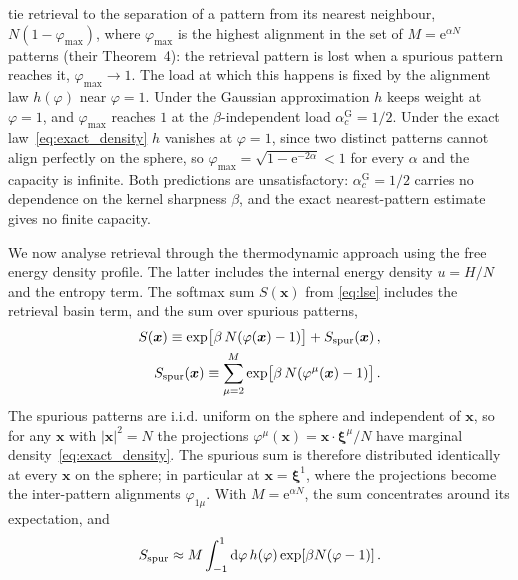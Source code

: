 \documentclass[letterpaper]{article} %
\newcommand{\bxi}{\boldsymbol{\xi}}
\newcommand{\bx}{\bm{x}}
\newcommand{\e}{{\mathrm{e}}}
\newcommand{\dd}{{\mathrm{d}}}
\newcommand{\Bnet}{\beta}
\newcommand{\acGauss}{\alpha_c^{\mathrm{G}}}
\begin{document}
\citet{ramsauer2021hopfield} tie retrieval to the separation of a pattern from its
nearest neighbour, $N(1-\varphi_{\max})$, where $\varphi_{\max}$ is the highest alignment
in the set of $M=\e^{\alpha N}$ patterns (their Theorem~4): the retrieval pattern
is lost when a spurious pattern reaches it, $\varphi_{\max}\to1$. The load at which
this happens is fixed by the alignment law $h(\varphi)$ near $\varphi=1$.
Under the Gaussian approximation $h$ keeps weight at $\varphi=1$, and $\varphi_{\max}$
reaches $1$ at the $\Bnet$-independent load $\acGauss=1/2$. Under the exact
law~\eqref{eq:exact_density} $h$ vanishes at $\varphi=1$, since two distinct patterns
cannot align perfectly on the sphere, so $\varphi_{\max}=\sqrt{1-\e^{-2\alpha}}<1$ for
every $\alpha$ and the capacity is infinite. Both predictions are unsatisfactory: 
$\acGauss=1/2$ carries no dependence on
the kernel sharpness $\Bnet$, and the exact nearest-pattern estimate gives no
finite capacity. 

We now analyse retrieval through the thermodynamic approach using the free energy density profile. 
The latter includes the internal energy density $u = H/N$ and the entropy term. 
The softmax sum $S(\bx)$ from \eqref{eq:lse} includes the retrieval basin term, and the sum over spurious patterns, 
\begin{align} 
S(\bx) \equiv \exp\!\big[\Bnet\,N (\varphi(\bx)-1) \big] + S_{\rm spur}(\bx)\,,\label{eq:softmax_sum}\\
S_{\rm spur}(\bx) \equiv \sum_{\mu=2}^{M}\exp\!\big[\Bnet\,N (\varphi^\mu(\bx)-1) \big]\,. \label{eq:spur_sum}
\end{align}
The spurious patterns are i.i.d. uniform on the sphere and independent of $\bx$, so for any $\bx$ with $|\bx|^2=N$ 
the projections $\varphi^\mu(\bx)=\bx\cdot\bxi^\mu/N$ have marginal density~\eqref{eq:exact_density}. 
The spurious sum is therefore distributed identically at every $\bx$ on the sphere; in particular 
at $\bx=\bxi^1$, where the projections become the inter-pattern alignments $\varphi_{1\mu}$. With $M=\e^{\alpha N}$, 
the sum concentrates around its expectation, and 
\begin{equation} 
    S_{\rm spur} \approx M\int_{-1}^1 \dd\varphi\, h(\varphi)\exp[\Bnet N(\varphi-1)]\,.
    \label{eq:spur_integral}
\end{equation}
\end{document}
